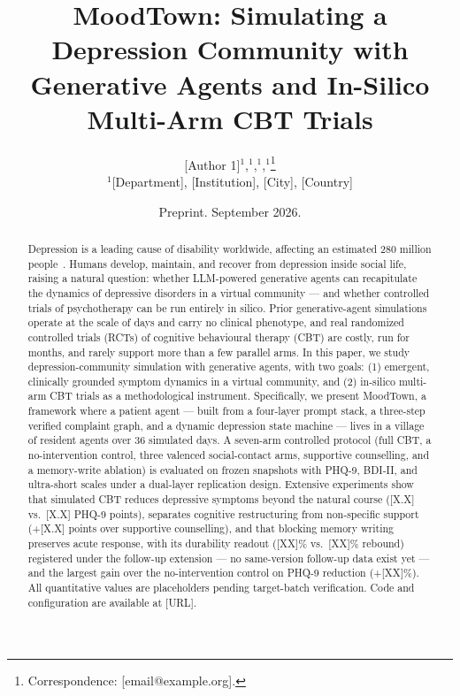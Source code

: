 \documentclass[10pt]{article}
\newcommand{\sys}{MoodTown}
\begin{document}
\title{\bfseries \sys: Simulating a Depression Community with Generative Agents and In-Silico Multi-Arm CBT Trials}

\author{%
  [Author 1]$^{1}$,\; [Author 2]$^{1}$,\; [Author 3]$^{1}$,\; [Author 4]$^{1}$\thanks{Correspondence: [email@example.org].}\\
  $^{1}$[Department], [Institution], [City], [Country]
}
\date{Preprint. September 2026.}

\maketitle

\begin{abstract}
\noindent
Depression is a leading cause of disability worldwide, affecting an estimated 280 million people~\citep{who2022}.
Humans develop, maintain, and recover from depression inside social life, raising a natural question: whether LLM-powered generative agents can recapitulate the dynamics of depressive disorders in a virtual community --- and whether controlled trials of psychotherapy can be run entirely in silico.
Prior generative-agent simulations operate at the scale of days and carry no clinical phenotype, and real randomized controlled trials (RCTs) of cognitive behavioural therapy (CBT) are costly, run for months, and rarely support more than a few parallel arms.
In this paper, we study depression-community simulation with generative agents, with two goals: (1) emergent, clinically grounded symptom dynamics in a virtual community, and (2) in-silico multi-arm CBT trials as a methodological instrument.
Specifically, we present \sys, a framework where a patient agent --- built from a four-layer prompt stack, a three-step verified complaint graph, and a dynamic depression state machine --- lives in a village of resident agents over 36 simulated days.
A seven-arm controlled protocol (full CBT, a no-intervention control, three valenced social-contact arms, supportive counselling, and a memory-write ablation) is evaluated on frozen snapshots with PHQ-9, BDI-II, and ultra-short scales under a dual-layer replication design.
Extensive experiments show that simulated CBT reduces depressive symptoms beyond the natural course ([X.X] vs.\ [X.X] PHQ-9 points), separates cognitive restructuring from non-specific support (+[X.X] points over supportive counselling), and that blocking memory writing preserves acute response, with its durability readout ([XX]\% vs.\ [XX]\% rebound) registered under the follow-up extension --- no same-version follow-up data exist yet --- and the largest gain over the no-intervention control on PHQ-9 reduction (+[XX]\%).
All quantitative values are placeholders pending target-batch verification.
Code and configuration are available at [URL].
\end{abstract}
\end{document}

